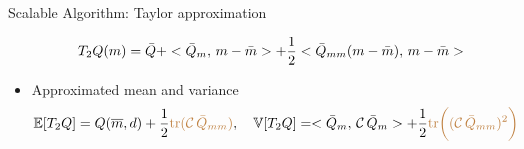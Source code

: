 \documentclass[10pt,xcolor=dvipsnames,compress]{beamer}
\begin{document}
\begin{frame}{Scalable Algorithm: Taylor approximation}
\begin{itemize}
\begin{equation*}
                            T_2Q(m)  = \Bar{Q}  +   <\Bar{Q}_m, \,  m-\Bar{m}>  +  \frac{1}{2}<  \Bar{Q}_{mm}(m-\Bar{m}),  \,  m-\Bar{m}  >
\end{equation*}
\item Approximated mean and variance \footnotemark 
\begin{equation*}
     \mathbb{E}[T_2 Q] = Q(\overline{m},d) + \frac{1}{2} \textcolor{brown}{\mathrm{tr}(\mathcal{C}\,\Bar{Q}_{mm})}, \quad \mathbb{V}[T_2 Q] = <\Bar{Q}_m, \,    \mathcal{C}\,\Bar{Q}_m>  
                            + 
                            \frac{1}{2} \textcolor{brown}{\mathrm{tr}\bigg(       (\mathcal{C}\,\Bar{Q}_{mm})^2         \bigg)}
\end{equation*}
\end{itemize}
\scriptsize{}
\end{frame}
\end{document}
